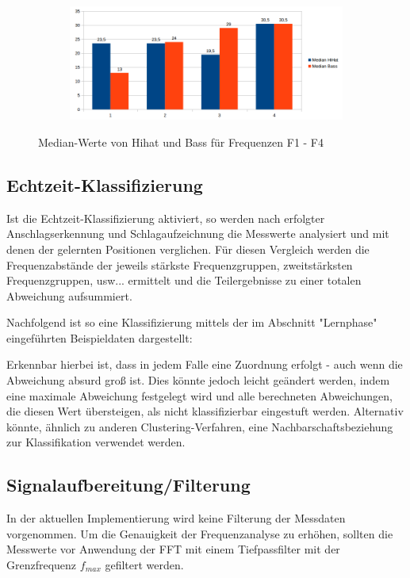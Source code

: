 \begin{figure}[H]
\centering
\begin{subfigure}{.5\textwidth}
		\includegraphics[scale=0.5]{figures/Median_hihatbass.png}
\end{subfigure}
\caption{Median-Werte  von Hihat und Bass für Frequenzen F1 - F4}
\label{fig:FFT_Median}
\end{figure}


\subsection*{Echtzeit-Klassifizierung}
Ist die Echtzeit-Klassifizierung aktiviert, so werden nach erfolgter Anschlagserkennung und Schlagaufzeichnung die Messwerte analysiert und mit denen der gelernten Positionen verglichen. 
Für diesen Vergleich werden die Frequenzabstände der jeweils stärkste Frequenzgruppen, zweitstärksten Frequenzgruppen, usw... ermittelt und die Teilergebnisse zu einer totalen Abweichung aufsummiert.

Nachfolgend ist so eine Klassifizierung mittels der im Abschnitt "Lernphase" eingeführten Beispieldaten dargestellt:


 
Erkennbar hierbei ist, dass in jedem Falle eine Zuordnung erfolgt - auch wenn die Abweichung absurd groß ist. Dies könnte jedoch leicht geändert werden, indem eine maximale Abweichung festgelegt wird und alle berechneten Abweichungen, die diesen Wert übersteigen, als nicht klassifizierbar eingestuft werden. Alternativ könnte, ähnlich zu anderen Clustering-Verfahren, eine Nachbarschaftsbeziehung zur Klassifikation verwendet werden.

\subsection*{Signalaufbereitung/Filterung}

In der aktuellen Implementierung wird keine Filterung der Messdaten vorgenommen. 
Um die Genauigkeit der Frequenzanalyse zu erhöhen, sollten die Messwerte vor Anwendung der FFT mit einem Tiefpassfilter mit der Grenzfrequenz $f_{max}$ gefiltert werden.

